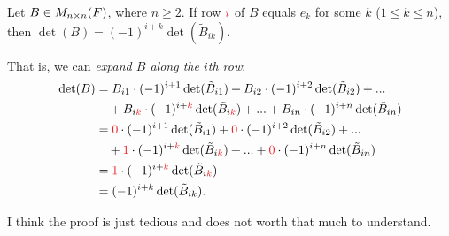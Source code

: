 \begin{lemma} \label{lem 4.1}
Let \(B \in M_{n \times n}(F)\), where \(n \ge 2\).
If row \(\RED{i}\) of \(B\) equals \(e_k\) for some \(k\) (\(1 \le k \le n\)), then \(\det(B) = (-1)^{i + k} \det(\tilde{B}_{ik})\).

That is, we can \emph{expand \(B\) along the \(i\)th row}:
\begin{align*}
    \det(B) & = B_{i1} \cdot (-1)^{i + 1} \det(\tilde{B}_{i1}) + B_{i2} \cdot (-1)^{i + 2} \det(\tilde{B}_{i2}) + ... \\
            & \quad + B_{i\RED{k}} \cdot (-1)^{i + \RED{k}} \det(\tilde{B}_{i\RED{k}}) + ... + B_{in} \cdot (-1)^{i + n} \det(\tilde{B}_{in}) \\
            & = \RED{0} \cdot (-1)^{i + 1} \det(\tilde{B}_{i1}) + \RED{0} \cdot (-1)^{i + 2} \det(\tilde{B}_{i2}) + ... \\
            & \quad + \RED{1} \cdot (-1)^{i + \RED{k}} \det(\tilde{B}_{i\RED{k}}) + ... + \RED{0} \cdot (-1)^{i + n} \det(\tilde{B}_{in}) \\
            & = \RED{1} \cdot (-1)^{i + \RED{k}} \det(\tilde{B}_{i\RED{k}}) \\
            & = (-1)^{i + k} \det(\tilde{B}_{ik}).
\end{align*}
\end{lemma}

\begin{note}
I think the proof is just tedious and does not worth that much to understand.
\end{note}

